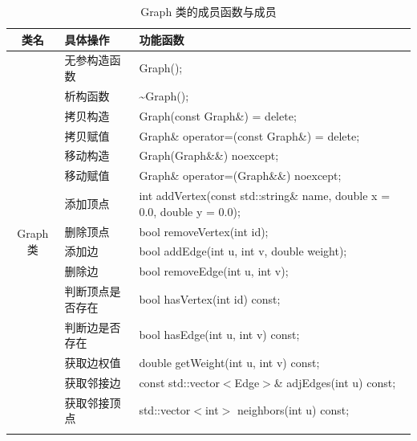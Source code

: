 \documentclass[UTF8,12pt,a4paper]{ctexart}
\begin{document}
\begin{table}[H]
\centering
\caption{Graph 类的成员函数与成员}
\renewcommand{\arraystretch}{1.3}
\begin{tabular}{|
c|
>{\centering\arraybackslash}m{4cm}|
>{\centering\arraybackslash}m{9cm}|}
\hline
\textbf{类名} & \textbf{具体操作} & \textbf{功能函数} \\
\hline
\multirow{18}{*}{Graph 类}
& 无参构造函数
& Graph(); \\
\cline{2-3}

& 析构函数
& \textasciitilde Graph(); \\
\cline{2-3}

& 拷贝构造
& Graph(const Graph\&) = delete; \\
\cline{2-3}

& 拷贝赋值
& Graph\& operator=(const Graph\&) = delete; \\
\cline{2-3}

& 移动构造
& Graph(Graph\&\&) noexcept; \\
\cline{2-3}

& 移动赋值
& Graph\& operator=(Graph\&\&) noexcept; \\
\cline{2-3}

& 添加顶点
& int addVertex(const std::string\& name, double x = 0.0, double y = 0.0); \\
\cline{2-3}

& 删除顶点
& bool removeVertex(int id); \\
\cline{2-3}

& 添加边
& bool addEdge(int u, int v, double weight); \\
\cline{2-3}

& 删除边
& bool removeEdge(int u, int v); \\
\cline{2-3}

& 判断顶点是否存在
& bool hasVertex(int id) const; \\
\cline{2-3}

& 判断边是否存在
& bool hasEdge(int u, int v) const; \\
\cline{2-3}

& 获取边权值
& double getWeight(int u, int v) const; \\
\cline{2-3}

& 获取邻接边
& const std::vector$<$Edge$>$\& adjEdges(int u) const; \\
\cline{2-3}

& 获取邻接顶点
& std::vector$<$int$>$ neighbors(int u) const; \\
\cline{2-3}


\end{tabular}
\end{table}
\end{document}
